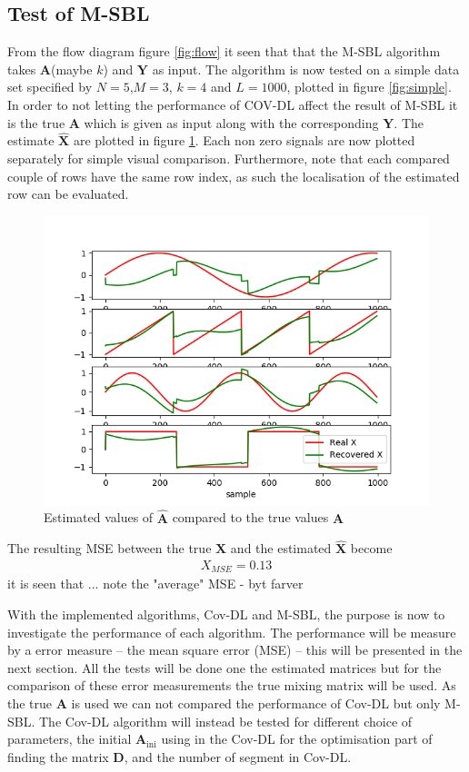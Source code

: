 \subsection{Test of M-SBL}
From the flow diagram figure \ref{fig:flow} it seen that that the M-SBL algorithm takes $\textbf{A}$(maybe $k$) and $\textbf{Y}$ as input. The algorithm is now tested on a simple data set specified by $N=5$,$M = 3$, $k=4$ and $L=1000$, plotted in figure \ref{fig:simple}. 
In order to not letting the performance of COV-DL affect the result of M-SBL it is the true $\textbf{A}$ which is given as input along with the corresponding $\textbf{Y}$. The estimate $\hat{\textbf{X}}$ are plotted in figure \ref{fig:M-SBL_simple}. Each non zero signals are now plotted separately for simple visual comparison. Furthermore, note that each compared couple of rows have the same row index, as such the localisation of the estimated row can be evaluated.
\begin{figure}
    \centering
	\includegraphics[scale=0.5]{figures/ch_6/M-SBL_simple.png}
	\caption{Estimated values of $\hat{\textbf{A}}$ compared to the true 				values $\textbf{A}$}
	\label{fig:M-SBL_simple}
\end{figure}
The resulting MSE between the true $\textbf{X}$ and the estimated $\hat{\textbf{X}}$ become 
\begin{align*}
X_{MSE} = 0.13 
\end{align*}
it is seen that ... note the "average" MSE - byt farver

With the implemented algorithms, Cov-DL and M-SBL, the purpose is now to investigate the performance of each algorithm. The performance will be measure by a error measure -- the mean square error (MSE) -- this will be presented in the next section. 
All the tests will be done one the estimated matrices but for the comparison of these error measurements the true mixing matrix will be used. 
As the true $\mathbf{A}$ is used we can not compared the performance of Cov-DL but only M-SBL. 
The Cov-DL algorithm will instead be tested for different choice of parameters, the initial $\mathbf{A}_{\text{ini}}$ using in the Cov-DL for the optimisation part of finding the matrix $\mathbf{D}$, and the number of segment in Cov-DL.

